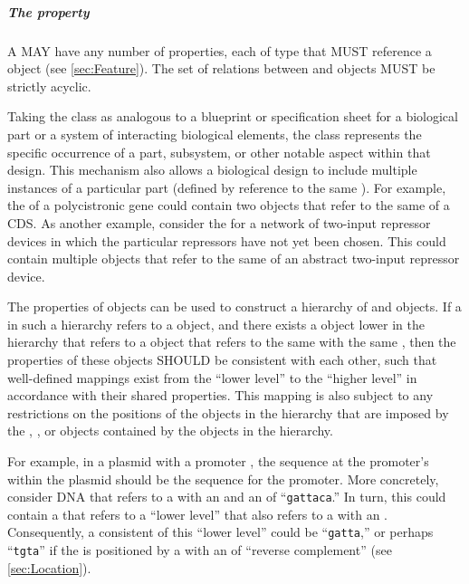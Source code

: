 \subparagraph{The  property}
\label{sec:hasFeature}

A  MAY have any number of  properties, each of type  that MUST reference a  object (see \ref{sec:Feature}). The set of relations between  and  objects MUST be strictly acyclic.

Taking the  class as analogous to a blueprint or specification sheet for a biological part or a system of interacting biological elements, the  class represents the specific occurrence of a part, subsystem, or other notable aspect within that design.  
This mechanism also allows a biological design to include multiple instances of a particular part (defined by reference to the same ). 
For example, the  of a polycistronic gene could contain two  objects that refer to the same  of a CDS.  
As another example, consider the  for a network of two-input repressor devices in which the particular repressors have not yet been chosen.
This  could contain multiple  objects that refer to the same  of an abstract two-input repressor device.

The  properties of  objects can be used to construct a hierarchy of  and  objects.  If a  in such a hierarchy refers to a  object, and there exists a  object lower in the hierarchy that refers to a  object that refers to the same  with the same , then the  properties of these  objects SHOULD be consistent with each other, such that well-defined mappings exist from the ``lower level''  to the ``higher level''  in accordance with their shared  properties. This mapping is also subject to any restrictions on the positions of the  objects in the hierarchy that are imposed by the , , or  objects contained by the  objects in the hierarchy.

For example, in a plasmid  with a promoter , the sequence at the promoter's  within the plasmid should be the sequence for the promoter.
More concretely, consider DNA  that refers to a  with an   and an   of ``{\tt gattaca}.'' In turn, this  could contain a  that refers to a ``lower level''   that also refers to a  with an  . Consequently, a consistent   of this ``lower level''  could be ``{\tt gatta},'' or perhaps ``{\tt tgta}'' if the  is positioned by a  with an  of ``reverse complement'' (see \ref{sec:Location}).

